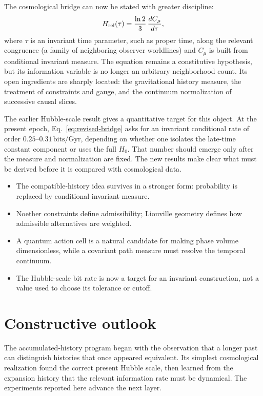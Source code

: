 \documentclass[10pt]{article}
\newenvironment{persuasions}
  {\begin{cpbox}\small\setlength{\parskip}{0pt}%
   {\footnotesize\bfseries\color{accent}%
    \textls[110]{CONCEPTUAL PERSUASIONS}}\par\vspace{3pt}%
   \begin{itemize}[leftmargin=1.15em,itemsep=2.5pt,topsep=0pt,parsep=0pt,
                   label=\textcolor{accent}{\scriptsize$\blacktriangleright$}]}
  {\end{itemize}\end{cpbox}}
\begin{document}
The cosmological bridge can now be stated with greater discipline:
\begin{equation}
H_{\rm rel}(\tau)
=\frac{\ln2}{3}\,
\frac{d C_\mu}{d\tau},
\label{eq:revised-bridge}
\end{equation}
where $\tau$ is an invariant time parameter, such as proper time, along the
relevant congruence (a family of neighboring observer worldlines) and $C_\mu$
is built from conditional invariant measure.  The equation remains a
constitutive hypothesis, but its information variable is no longer an
arbitrary neighborhood count.  Its open ingredients are sharply located:
the gravitational history measure, the treatment of constraints and gauge,
and the continuum normalization of successive causal slices.

The earlier Hubble-scale result gives a quantitative target for this object.
At the present epoch, Eq.~\eqref{eq:revised-bridge} asks for an invariant
conditional rate of order $0.25$--$0.31\,\mathrm{bits/Gyr}$, depending on
whether one isolates the late-time constant component or uses the full
$H_0$.  That number should emerge only after the measure and normalization are
fixed.  The new results make clear what must be derived before it is compared
with cosmological data.

\begin{persuasions}
\item The compatible-history idea survives in a stronger form: probability is
replaced by conditional invariant measure.
\item Noether constraints define admissibility; Liouville geometry defines how
admissible alternatives are weighted.
\item A quantum action cell is a natural candidate for making phase volume
dimensionless, while a covariant path measure must resolve the temporal
continuum.
\item The Hubble-scale bit rate is now a target for an invariant construction,
not a value used to choose its tolerance or cutoff.
\end{persuasions}

\section*{Constructive outlook}

The accumulated-history program began with the observation that a longer past
can distinguish histories that once appeared equivalent.  Its simplest
cosmological realization found the correct present Hubble scale, then learned
from the expansion history that the relevant information rate must be
dynamical.  The experiments reported here advance the next layer.
\end{document}
